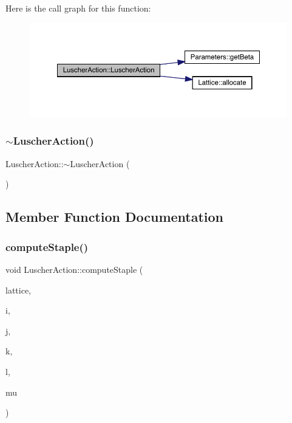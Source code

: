 Here is the call graph for this function\+:\nopagebreak
\begin{figure}[H]
\begin{center}
\leavevmode
\includegraphics[width=350pt]{class_luscher_action_a2389aab5b35b4c5ccb0ae5a45f68430b_cgraph}
\end{center}
\end{figure}
\mbox{\label{class_luscher_action_a3b4de167f04479da56fd4aa1e7fe0bbb}} 
\subsubsection{\texorpdfstring{$\sim$LuscherAction()}{~LuscherAction()}}
{\footnotesize\ttfamily Luscher\+Action\+::$\sim$\+Luscher\+Action (\begin{DoxyParamCaption}{ }\end{DoxyParamCaption})}



\subsection{Member Function Documentation}
\mbox{\label{class_luscher_action_a42285b6e3015935588e1fab6b90c1a11}} 
\subsubsection{\texorpdfstring{computeStaple()}{computeStaple()}}
{\footnotesize\ttfamily void Luscher\+Action\+::compute\+Staple (\begin{DoxyParamCaption}\item[{\mbox{\hyperlink{class_lattice}{Lattice}}$<$ \mbox{\hyperlink{class_s_u3}{S\+U3}} $>$ $\ast$}]{lattice,  }\item[{unsigned int}]{i,  }\item[{unsigned int}]{j,  }\item[{unsigned int}]{k,  }\item[{unsigned int}]{l,  }\item[{int}]{mu }\end{DoxyParamCaption})\hspace{0.3cm}{\ttfamily [virtual]}}



